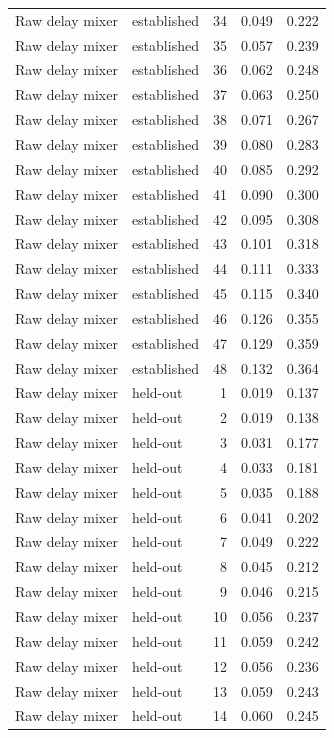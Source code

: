 \begin{tabular}{llrrr}
Raw delay mixer & established & 34 & 0.049 & 0.222 \\
Raw delay mixer & established & 35 & 0.057 & 0.239 \\
Raw delay mixer & established & 36 & 0.062 & 0.248 \\
Raw delay mixer & established & 37 & 0.063 & 0.250 \\
Raw delay mixer & established & 38 & 0.071 & 0.267 \\
Raw delay mixer & established & 39 & 0.080 & 0.283 \\
Raw delay mixer & established & 40 & 0.085 & 0.292 \\
Raw delay mixer & established & 41 & 0.090 & 0.300 \\
Raw delay mixer & established & 42 & 0.095 & 0.308 \\
Raw delay mixer & established & 43 & 0.101 & 0.318 \\
Raw delay mixer & established & 44 & 0.111 & 0.333 \\
Raw delay mixer & established & 45 & 0.115 & 0.340 \\
Raw delay mixer & established & 46 & 0.126 & 0.355 \\
Raw delay mixer & established & 47 & 0.129 & 0.359 \\
Raw delay mixer & established & 48 & 0.132 & 0.364 \\
Raw delay mixer & held-out & 1 & 0.019 & 0.137 \\
Raw delay mixer & held-out & 2 & 0.019 & 0.138 \\
Raw delay mixer & held-out & 3 & 0.031 & 0.177 \\
Raw delay mixer & held-out & 4 & 0.033 & 0.181 \\
Raw delay mixer & held-out & 5 & 0.035 & 0.188 \\
Raw delay mixer & held-out & 6 & 0.041 & 0.202 \\
Raw delay mixer & held-out & 7 & 0.049 & 0.222 \\
Raw delay mixer & held-out & 8 & 0.045 & 0.212 \\
Raw delay mixer & held-out & 9 & 0.046 & 0.215 \\
Raw delay mixer & held-out & 10 & 0.056 & 0.237 \\
Raw delay mixer & held-out & 11 & 0.059 & 0.242 \\
Raw delay mixer & held-out & 12 & 0.056 & 0.236 \\
Raw delay mixer & held-out & 13 & 0.059 & 0.243 \\
Raw delay mixer & held-out & 14 & 0.060 & 0.245 \\

\end{tabular}
